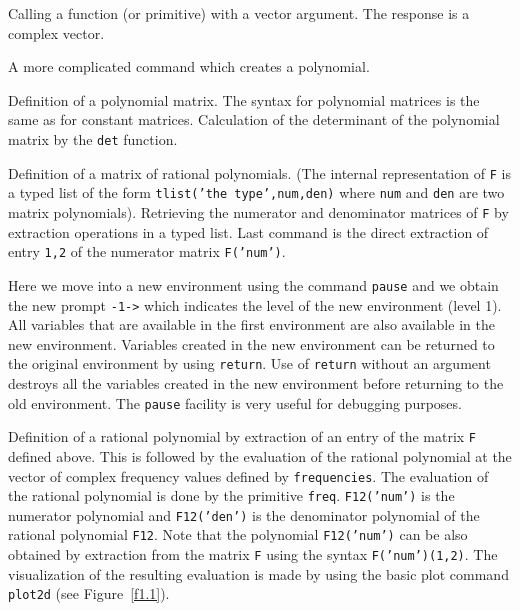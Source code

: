 \noindent\dotfill



Calling a function (or primitive) with a vector argument.  The response
is a complex vector.

\noindent\dotfill



A  more complicated command which creates a polynomial. 

\noindent\dotfill



Definition of a polynomial matrix. The syntax for polynomial matrices
is the same as for constant matrices. Calculation of the
determinant of the polynomial matrix by the {\tt det} function. 


\noindent\dotfill



Definition of a matrix of rational polynomials. (The internal representation
of {\tt F} is a typed list of the form {\tt tlist('the type',num,den)}
where {\tt num} and {\tt den} are two matrix polynomials). Retrieving
the numerator and denominator matrices of {\tt F} by extraction operations in a
typed list. Last command is the direct extraction of entry {\tt 1,2} 
of the numerator matrix {\tt F('num')}.

\noindent\dotfill




Here we move into a new environment using the command 
{\tt pause}
and we obtain the new prompt {\tt -1->} which indicates the level
of the new environment (level 1).  All variables that are available
in the first environment are also available in the new environment.  Variables
created in the new environment can be returned to the original environment
by using {\tt return}.  
Use of {\tt return} without an argument 
destroys all the variables created in the new environment before returning
to the old environment. The {\tt pause} facility is very useful 
for debugging purposes.

\noindent\dotfill



Definition of a rational polynomial by extraction of an entry
of the matrix {\tt F} defined above.  This is followed by the evaluation
of the rational polynomial at the vector of complex frequency values defined
by {\tt frequencies}.  The evaluation of the rational polynomial is done by
the primitive {\tt freq}. {\tt F12('num')} is the numerator
polynomial and {\tt F12('den')} is the denominator polynomial of the
rational polynomial {\tt F12}. Note that
the polynomial {\tt F12('num')} can be also obtained by extraction
from the matrix {\tt F} using the syntax {\tt F('num')(1,2)}.
The  visualization of the resulting evaluation
is made by using the basic plot command {\tt plot2d} (see Figure~\ref{f1.1}).

